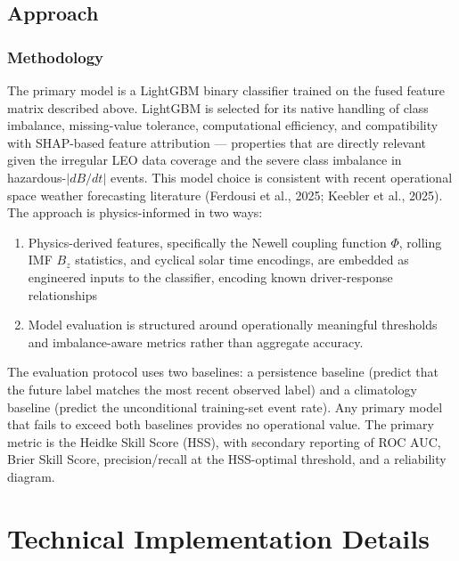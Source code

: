 \documentclass{article}
\begin{document}
\subsection*{Approach}

\subsubsection*{Methodology}
The primary model is a LightGBM binary classifier trained on the fused feature matrix described above. LightGBM is selected for its native handling of class imbalance, missing-value tolerance, computational efficiency, and compatibility with SHAP-based feature attribution — properties that are directly relevant given the irregular LEO data coverage and the severe class imbalance in hazardous-$|dB/dt|$ events. This model choice is consistent with recent operational space weather forecasting literature (Ferdousi et al., 2025; Keebler et al., 2025).\\

\noindent The approach is physics-informed in two ways: \\
\begin{enumerate}
  \item Physics-derived features, specifically the Newell coupling function $\Phi$, rolling IMF $B_z$ statistics, and cyclical solar time encodings, are embedded as engineered inputs to the classifier, encoding known driver-response relationships
  \item Model evaluation is structured around operationally meaningful thresholds and imbalance-aware metrics rather than aggregate accuracy.
\end{enumerate}

\noindent The evaluation protocol uses two baselines: a persistence baseline (predict that the future label matches the most recent observed label) and a climatology baseline (predict the unconditional training-set event rate). Any primary model that fails to exceed both baselines provides no operational value. The primary metric is the Heidke Skill Score (HSS), with secondary reporting of ROC AUC, Brier Skill Score, precision/recall at the HSS-optimal threshold, and a reliability diagram.

\section{Technical Implementation Details}
\end{document}
